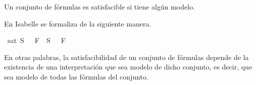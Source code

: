 \begin{isabellebody}
\begin{isamarkuptext}
  \begin{definicion}
    Un conjunto de fórmulas es satisfacible si tiene algún modelo.
  \end{definicion}

  En Isabelle se formaliza de la siguiente manera.%
\end{isamarkuptext}\isamarkuptrue%
\isamarkupfalse%
\ {\isachardoublequoteopen}sat\ S\ {\isasymequiv}\ {\isasymexists}{\isasymA}{\isachardot}\ {\isasymforall}F\ {\isasymin}\ S{\isachardot}\ {\isasymA}\ {\isasymTurnstile}\ F{\isachardoublequoteclose}%
\begin{isamarkuptext}%
En otras palabras, la satisfacibilidad de un conjunto de fórmulas 
  depende de la existencia de una interpretación que sea modelo de dicho 
  conjunto, es decir, que sea modelo de todas las fórmulas del conjunto.
  

\end{isamarkuptext}
\end{isabellebody}
